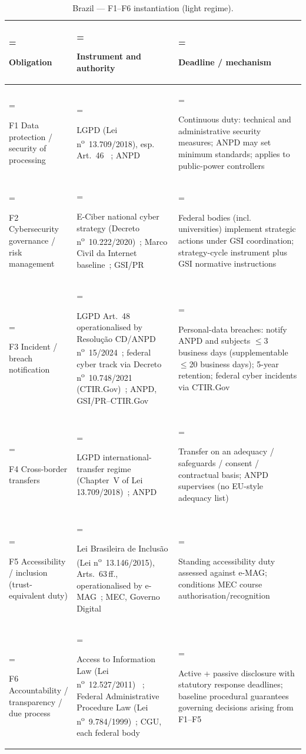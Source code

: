 \begin{table}[H]
\centering\small
\caption{Brazil --- F1--F6 instantiation (light regime).}
\label{tab:reg-br}
\renewcommand{\arraystretch}{1.25}
\begin{tabularx}{\textwidth}{%
  >{\hsize=0.40\hsize\linewidth=\hsize\bfseries\raggedright\arraybackslash}X%
  >{\hsize=1.42\hsize\linewidth=\hsize\raggedright\arraybackslash}X%
  >{\hsize=1.18\hsize\linewidth=\hsize\raggedright\arraybackslash}X%
}
\toprule
Obligation & Instrument and authority & Deadline / mechanism \\
\midrule
F1 Data protection / security of processing
  & LGPD (Lei n\textsuperscript{o}~13.709/2018), esp. Art.~46~%
    \cite{br-lgpd-13709}; ANPD
  & Continuous duty: technical and administrative security measures;
    ANPD may set minimum standards; applies to public-power controllers \\
F2 Cybersecurity governance / risk management
  & E-Ciber national cyber strategy (Decreto
    n\textsuperscript{o}~10.222/2020)~\cite{br-eciber-d10222};
    Marco Civil da Internet baseline~\cite{br-marco-civil-12965};
    GSI/PR
  & Federal bodies (incl. universities) implement strategic actions
    under GSI coordination; strategy-cycle instrument plus GSI
    normative instructions \\
F3 Incident / breach notification
  & LGPD Art.~48 operationalised by Resolu\c{c}\~ao CD/ANPD
    n\textsuperscript{o}~15/2024~\cite{br-anpd-res15-2024}; federal
    cyber track via Decreto n\textsuperscript{o}~10.748/2021
    (CTIR.Gov)~\cite{br-redeinc-d10748}; ANPD, GSI/PR--CTIR.Gov
  & Personal-data breaches: notify ANPD and subjects $\le$3 business
    days (supplementable $\le$20 business days); 5-year retention;
    federal cyber incidents via CTIR.Gov \\
F4 Cross-border transfers
  & LGPD international-transfer regime (Chapter~V of Lei
    13.709/2018)~\cite{br-lgpd-13709}; ANPD
  & Transfer on an adequacy / safeguards / consent / contractual
    basis; ANPD supervises (no EU-style adequacy list) \\
F5 Accessibility / inclusion (trust-equivalent duty)
  & Lei Brasileira de Inclus\~ao (Lei n\textsuperscript{o}~13.146/2015),
    Arts.~63\,ff., operationalised by e-MAG~\cite{br-lbi-13146}; MEC,
    Governo Digital
  & Standing accessibility duty assessed against e-MAG; conditions MEC
    course authorisation/recognition \\
F6 Accountability / transparency / due process
  & Access to Information Law (Lei n\textsuperscript{o}~12.527/2011)~%
    \cite{br-lai-12527}; Federal Administrative Procedure Law (Lei
    n\textsuperscript{o}~9.784/1999)~\cite{br-procadm-9784}; CGU,
    each federal body
  & Active + passive disclosure with statutory response deadlines;
    baseline procedural guarantees governing decisions arising from
    F1--F5 \\
\bottomrule
\end{tabularx}
\end{table}

